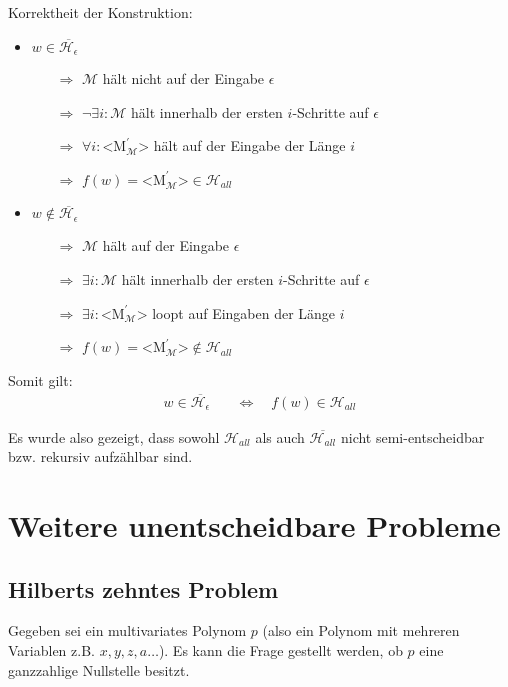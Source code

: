 \documentclass{scrartcl}%
\begin{document}
    Korrektheit der Konstruktion:
    \begin{itemize}
        \item $w \in \overline{\mathcal{H}_\epsilon}$
        \begin{itemize}
            \item [$\Rightarrow$] $\mathcal{M}$ hält nicht auf der Eingabe $\epsilon$
            \item [$\Rightarrow$] $\neg \exists i: \mathcal{M}$ hält innerhalb der ersten $i$-Schritte auf $\epsilon$
            \item [$\Rightarrow$] $\forall i: \text{<M}^{'}_{\mathcal{M}}\text{>}$ hält auf der Eingabe der Länge $i$
            \item [$\Rightarrow$] $f(w) = \text{<M}^{'}_{\mathcal{M}}\text{>} \in \mathcal{H}_{all}$
        \end{itemize}
        \item $w \notin \overline{\mathcal{H}_\epsilon}$
        \begin{itemize}
            \item [$\Rightarrow$] $\mathcal{M}$ hält auf der Eingabe $\epsilon$
            \item [$\Rightarrow$] $\exists i: \mathcal{M}$ hält innerhalb der ersten $i$-Schritte auf $\epsilon$
            \item [$\Rightarrow$] $\exists i: \text{<M}^{'}_{\mathcal{M}}\text{>}$ loopt auf Eingaben der Länge $i$
            \item [$\Rightarrow$] $f(w) = \text{<M}^{'}_{\mathcal{M}}\text{>} \notin \mathcal{H}_{all}$
        \end{itemize}
    \end{itemize}

    Somit gilt:
    \begin{align*}
        w \in \overline{\mathcal{H}_{\epsilon}} & \quad \Leftrightarrow \quad f(w) \in \mathcal{H}_{all}
    \end{align*}\proofend

    \vspace*{0.3cm}
    Es wurde also gezeigt, dass sowohl $\mathcal{H}_{all}$ als auch $\overline{\mathcal{H}_{all}}$ nicht semi-entscheidbar bzw. rekursiv aufzählbar sind.

    \newpage
    \section*{Weitere unentscheidbare Probleme}
    \subsection*{Hilberts zehntes Problem}
    Gegeben sei ein multivariates Polynom $p$ (also ein Polynom mit mehreren Variablen z.B. $x,y,z,a \dots$).
    Es kann die Frage gestellt werden, ob $p$ eine ganzzahlige Nullstelle besitzt.
\end{document}
